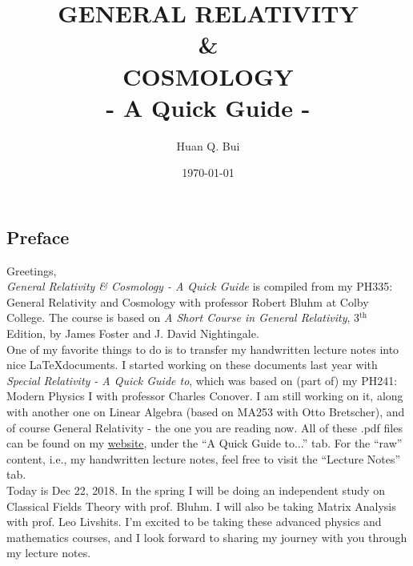 \documentclass{book}
\theoremstyle{definition}
\begin{document}
\begin{titlepage}\centering
 \clearpage
 \title{\textsc{\bf{GENERAL RELATIVITY\\ \& \\ COSMOLOGY}}\\\smallskip - A Quick Guide - \\}
 \author{\bigskip Huan Q. Bui}
 \date{\today}
 \maketitle
 \thispagestyle{empty}
\end{titlepage}

\subsection*{Preface}

Greetings,\\

\textit{General Relativity \& Cosmology - A Quick Guide} is compiled from my PH335: General Relativity and Cosmology with professor Robert Bluhm at Colby College. The course is based on \textit{A Short Course in General Relativity}, 3$^{\text{th}}$ Edition, by James Foster and J. David Nightingale.\\

One of my favorite things to do is to transfer my handwritten lecture notes into nice \LaTeX documents. I started working on these documents last year with \textit{Special Relativity - A Quick Guide to}, which was based on (part of) my PH241: Modern Physics I with professor Charles Conover. I am still working on it, along with another one on Linear Algebra (based on MA253 with Otto Bretscher), and of course General Relativity - the one you are reading now. All of these .pdf files can be found on my \href{www.huanqbui.com}{website}, under the ``A Quick Guide to...'' tab. For the ``raw'' content, i.e., my handwritten lecture notes, feel free to visit the ``Lecture Notes'' tab.\\

Today is Dec 22, 2018. In the spring I will be doing an independent study on Classical Fields Theory with prof. Bluhm. I will also be taking Matrix Analysis with prof. Leo Livshits. I'm excited to be taking these advanced physics and mathematics courses, and I look forward to sharing my journey with you through my lecture notes.  \\
\end{document}
